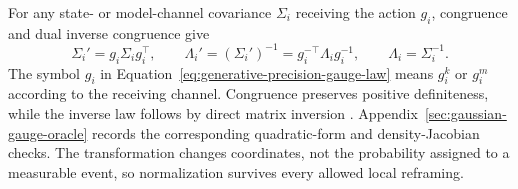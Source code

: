 For any state- or model-channel covariance \(\Sigma_i\) receiving the action \(g_i\), congruence and dual inverse congruence give
\begin{equation}
\Sigma_i'=g_i\Sigma_i g_i^\top,
\qquad
\Lambda_i'=(\Sigma_i')^{-1}
=g_i^{-\top}\Lambda_i g_i^{-1},
\qquad
\Lambda_i=\Sigma_i^{-1}.
\label{eq:generative-precision-gauge-law}
\end{equation}
The symbol \(g_i\) in Equation~\eqref{eq:generative-precision-gauge-law} means \(g_i^k\) or \(g_i^m\) according to the receiving channel. Congruence preserves positive definiteness, while the inverse law follows by direct matrix inversion \citep{HornJohnson2013,Bhatia2007}. Appendix~\ref{sec:gaussian-gauge-oracle} records the corresponding quadratic-form and density-Jacobian checks. The transformation changes coordinates, not the probability assigned to a measurable event, so normalization survives every allowed local reframing.
